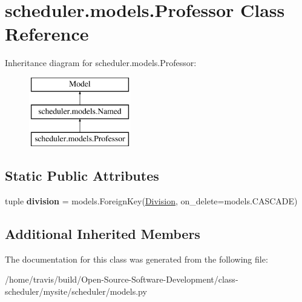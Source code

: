 \hypertarget{classscheduler_1_1models_1_1_professor}{\section{scheduler.\-models.\-Professor Class Reference}
\label{classscheduler_1_1models_1_1_professor}
}
Inheritance diagram for scheduler.\-models.\-Professor\-:\begin{figure}[H]
\begin{center}
\leavevmode
\includegraphics[height=3.000000cm]{classscheduler_1_1models_1_1_professor}
\end{center}
\end{figure}
\subsection*{Static Public Attributes}
\begin{DoxyCompactItemize}
\item 
\hypertarget{classscheduler_1_1models_1_1_professor_adf91e6bff4702170c31cb6135f23f31b}{tuple {\bfseries division} = models.\-Foreign\-Key(\hyperlink{classscheduler_1_1models_1_1_division}{Division}, on\-\_\-delete=models.\-C\-A\-S\-C\-A\-D\-E)}\label{classscheduler_1_1models_1_1_professor_adf91e6bff4702170c31cb6135f23f31b}

\end{DoxyCompactItemize}
\subsection*{Additional Inherited Members}


The documentation for this class was generated from the following file\-:\begin{DoxyCompactItemize}
\item 
/home/travis/build/\-Open-\/\-Source-\/\-Software-\/\-Development/class-\/scheduler/mysite/scheduler/models.\-py\end{DoxyCompactItemize}
